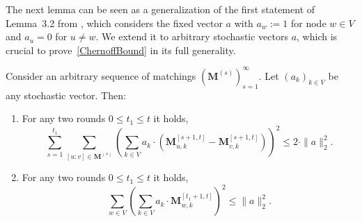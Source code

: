 \documentclass[twoside,leqno]{article}
\newcommand{\M}{\mathbf{M}}
\DeclareMathOperator{\1}{\mathbf{1}}
\numberwithin{equation}{section}
\begin{document}
The next lemma can be seen as a generalization of the first statement of Lemma~3.2 from \cite{DBLP:conf/focs/SauerwaldS12},  which considers the fixed vector $a$ with $a_w:=1$ for node $w\in V$ and $a_u=0$ for $u\neq w$. We extend it to arbitrary stochastic vectors $a$, which is crucial to prove~\cref{ChernoffBound} in its full generality.
\begin{lemma}\label{lem:theorem32_new}
Consider an arbitrary sequence of matchings $\left(\M^{(s)}\right)_{s=1}^{\infty}$.
Let $(a_k)_{k \in V}$  be any stochastic vector. Then: 
\begin{enumerate}
\item For any two rounds $0 \leq t_1 \le t$ it holds, 
\[
\sum_{s=1}^{t_1} \sum_{[u:v] \in \M^{(s)}} \left( \sum_{k \in V} a_k \cdot \left( \M_{u,k}^{[s+1,t]} -  \M_{v,k}^{[s+1,t]}\right) \right)^2 
\le 2\cdot  \|a \|_2^2.
\]

\item For any two rounds $0 \leq t_1\le t$ it holds,
\[
\sum_{w\in V}\left(\sum_{k\in V} a_k\cdot \M_{w,k}^{[t_1+1,t]}\right)^2 \le \|a\|_2^2.
\]
\end{enumerate}
\end{lemma}
\end{document}
